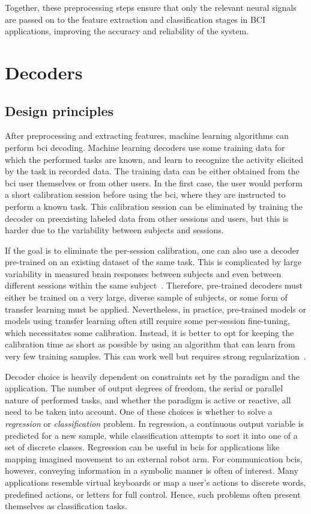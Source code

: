 Together, these preprocessing steps ensure that only the relevant neural signals are
passed on to the feature extraction and classification stages in BCI applications,
improving the accuracy and reliability of the system.

\section{Decoders}
\label{sec:bci/decoding}

\subsection{Design principles}

After preprocessing and extracting features, machine learning algorithms can perform
\ac{bci} decoding.
Machine learning decoders use some training data for which the performed tasks are
known, and learn to recognize the activity elicited by the task in recorded data.
The training data can be either obtained from the \ac{bci} user themselves or from other
users.
In the first case, the user would perform a short calibration session before using the
\ac{bci}, where they are instructed to perform a known task.
This calibration session can be eliminated by training the decoder on preexisting
labeled data from other sessions and users, but this is harder due to the variability
between subjects and sessions.

If the goal is to eliminate the per-session calibration, one can also use a decoder
pre-trained on an existing dataset of the same task.
This is complicated by large variability in measured brain responses between subjects
and even between different sessions within the same subject~\cite{Guger2009,Saha2020}.
Therefore, pre-trained decoders must either be trained on a very large, diverse sample
of subjects, or some form of transfer learning must be applied.
Nevertheless, in practice, pre-trained models or models using transfer learning often
still require some per-session fine-tuning, which necessitates some calibration.
Instead, it is better to opt for keeping the calibration time as short as possible by
using an algorithm that can learn from very few training samples.
This can work well but requires strong regularization~\cite{VanDenKerchove2022}.

Decoder choice is heavily dependent on constraints set by the paradigm and the
application.
The number of output degrees of freedom, the serial or parallel nature of performed
tasks, and whether the paradigm is active or reactive, all need to be taken into
account.
One of these choices is whether to solve a \emph{regression} or \emph{classification}
problem.
In regression, a continuous output variable is predicted for a new sample, while
classification attempts to sort it into one of a set of discrete classes.
Regression can be useful in \acp{bci} for applications like mapping imagined movement to
an external robot arm.
For communication \acp{bci}, however, conveying information in a symbolic manner is
often of interest.
Many applications resemble virtual keyboards or map a user's actions to discrete words,
predefined actions, or letters for full control.
Hence, such problems often present themselves as classification tasks.

